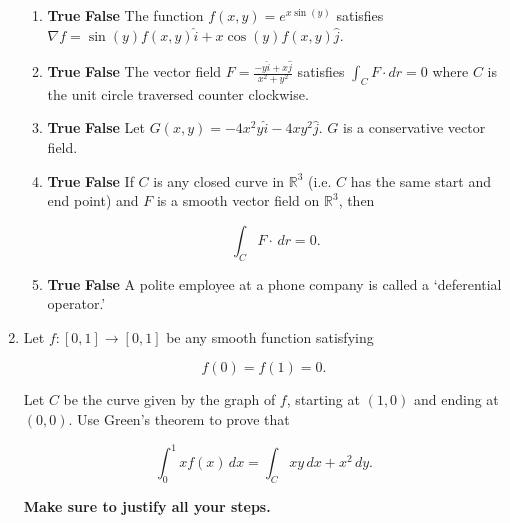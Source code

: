 \documentclass[12 pt]{report}
\begin{document}
\begin{enumerate}
\begin{enumerate} 
\item \textbf{True} \hspace{5pt} \textbf{False} \hspace{10pt} The function $f(x,y) = e^{x \sin(y)}$ satisfies $\nabla f = \sin(y) f(x,y) \hat{i} + x \cos(y) f(x,y) \hat{j}$.

\vfill

\item \textbf{True} \hspace{5pt} \textbf{False} \hspace{10pt} The vector field $F = \frac{-y \hat{i} + x \hat{j}}{x^2+y^2}$ satisfies $\int_C F \cdot dr = 0$ where $C$ is the unit circle traversed counter clockwise. 

\vfill

\item \textbf{True} \hspace{5pt} \textbf{False} \hspace{10pt} Let $G(x,y) = -4x^2 y \hat{i} - 4 x y^2 \hat{j}$. $G$ is a conservative vector field. 

\vfill

\item \textbf{True} \hspace{5pt} \textbf{False} \hspace{10pt} If $C$ is any closed curve in $\mathbb{R}^3$ (i.e. $C$ has the same start and end point) and $F$ is a smooth vector field on $\mathbb{R}^3$, then 

\begin{equation*}
\int_C F \cdot \, dr = 0.
\end{equation*}

\vfill

\item \textbf{True} \hspace{5pt} \textbf{False} \hspace{10pt} A polite employee at a phone company is called a `deferential operator.' 

\end{enumerate}

\newpage

\item Let $f:[0,1] \to [0,1]$ be any smooth function satisfying 

\begin{equation*}
f(0) = f(1) = 0.
\end{equation*}

 Let $C$ be the curve given by the graph of $f$, starting at $(1,0)$ and ending at $(0,0)$. Use Green's theorem to prove that 

\begin{equation*}
\int_0^1 x f(x) \, dx = \int_C x y \, dx + x^2 \, dy.
\end{equation*}

\textbf{Make sure to justify all your steps. }

\end{enumerate}
\end{document}
